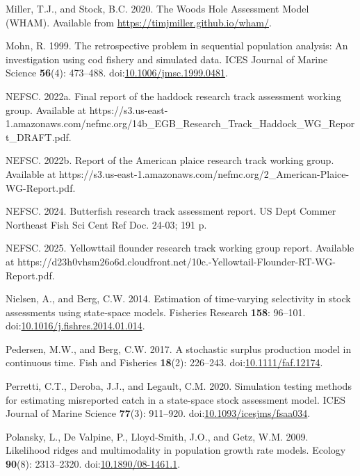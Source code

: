 \documentclass[
  12pt,
]{article}
\newlength{\cslhangindent}
\newenvironment{CSLReferences}[2] %
 {\begin{list}{}{%
  \setlength{\itemindent}{0pt}
  \setlength{\leftmargin}{0pt}
  \setlength{\parsep}{0pt}
  \ifodd #1
   \setlength{\leftmargin}{\cslhangindent}
   \setlength{\itemindent}{-1\cslhangindent}
  \fi
  \setlength{\itemsep}{#2\baselineskip}}}
 {\end{list}}
\begin{document}
\begin{CSLReferences}{1}{0}
Miller, T.J., and Stock, B.C. 2020. The {Woods Hole Assessment Model}
({WHAM}). Available from \url{https://timjmiller.github.io/wham/}.

Mohn, R. 1999. The retrospective problem in sequential population
analysis: An investigation using cod fishery and simulated data. ICES
Journal of Marine Science \textbf{56}(4): 473--488.
doi:\href{https://doi.org/10.1006/jmsc.1999.0481}{10.1006/jmsc.1999.0481}.

NEFSC. 2022a. Final report of the haddock research track assessment
working group. {Available} at
https://s3.us-east-1.amazonaws.com/nefmc.org/14b\_EGB\_Research\_Track\_Haddock\_WG\_Report\_DRAFT.pdf.

NEFSC. 2022b. Report of the {A}merican plaice research track working
group. {Available} at
https://s3.us-east-1.amazonaws.com/nefmc.org/2\_American-Plaice-WG-Report.pdf.

NEFSC. 2024. Butterfish research track assessment report. US Dept Commer
Northeast Fish Sci Cent Ref Doc. 24-03; 191 p.

NEFSC. 2025. Yellowttail flounder research track working group report.
{Available} at
https://d23h0vhsm26o6d.cloudfront.net/10c.-Yellowtail-Flounder-RT-WG-Report.pdf.

Nielsen, A., and Berg, C.W. 2014. Estimation of time-varying selectivity
in stock assessments using state-space models. Fisheries Research
\textbf{158}: 96--101.
doi:\href{https://doi.org/10.1016/j.fishres.2014.01.014}{10.1016/j.fishres.2014.01.014}.

Pedersen, M.W., and Berg, C.W. 2017. A stochastic surplus production
model in continuous time. Fish and Fisheries \textbf{18}(2): 226--243.
doi:\href{https://doi.org/10.1111/faf.12174}{10.1111/faf.12174}.

Perretti, C.T., Deroba, J.J., and Legault, C.M. 2020. Simulation testing
methods for estimating misreported catch in a state-space stock
assessment model. ICES Journal of Marine Science \textbf{77}(3):
911--920.
doi:\href{https://doi.org/10.1093/icesjms/fsaa034}{10.1093/icesjms/fsaa034}.

Polansky, L., De Valpine, P., Lloyd-Smith, J.O., and Getz, W.M. 2009.
Likelihood ridges and multimodality in population growth rate models.
Ecology \textbf{90}(8): 2313--2320.
doi:\href{https://doi.org/10.1890/08-1461.1}{10.1890/08-1461.1}.


\end{CSLReferences}
\end{document}
